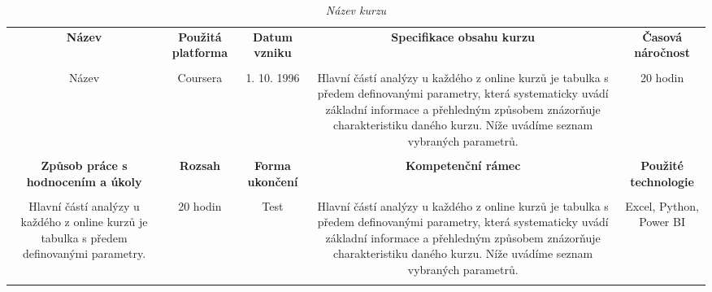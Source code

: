\begin{landscape}
\begin{table}[htbp]
  \renewcommand\thetable{2}
  \caption{\textit{Název kurzu}}\label{tab2}
  \scriptsize
  {
    \justifying
    \begin{tabularx}{\linewidth}{CCCCC}
      \toprule
     
      \textbf{Název} &
      \textbf{Použitá platforma} &
      \textbf{Datum vzniku} &
      \textbf{Specifikace obsahu kurzu} &
      \textbf{Časová náročnost}  \\
      
      \tabularnewline
      \midrule
      
        Název &
        Coursera &
        1. 10. 1996 &
        Hlavní částí analýzy u každého z online kurzů je tabulka s předem definovanými parametry, která systematicky uvádí základní informace a přehledným způsobem znázorňuje charakteristiku daného kurzu. Níže uvádíme seznam vybraných parametrů.&
        20 hodin \\
        
              \tabularnewline

      \toprule

        \textbf{Způsob práce s hodnocením a úkoly} &
        \textbf{Rozsah} &
        \textbf{Forma ukončení} &
        \textbf{Kompetenční rámec} &
        \textbf{Použité technologie} \\
      
        \tabularnewline
      \midrule
      
        Hlavní částí analýzy u každého z online kurzů je tabulka s předem definovanými parametry. &
        20 hodin &
        Test &
        Hlavní částí analýzy u každého z online kurzů je tabulka s předem definovanými parametry, která systematicky uvádí základní informace a přehledným způsobem znázorňuje charakteristiku daného kurzu. Níže uvádíme seznam vybraných parametrů.&
        Excel, Python, Power BI \\

        \tabularnewline
      \bottomrule
    \end{tabularx}
  }
\end{table}
\end{landscape}